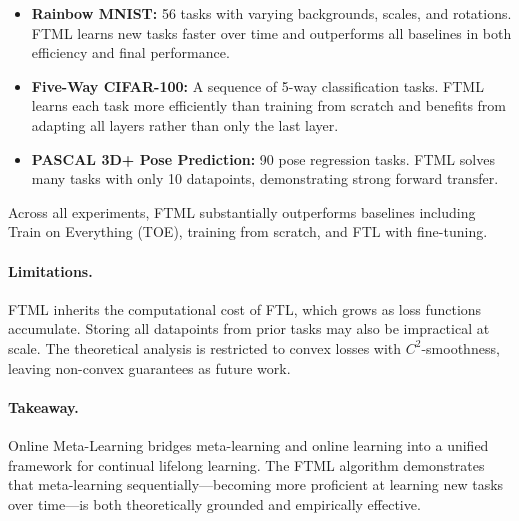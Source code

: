 \documentclass[12pt]{article}
\begin{document}
\begin{itemize}
		\item \textbf{Rainbow MNIST:} 56 tasks with varying backgrounds, scales,
				and rotations. FTML learns new tasks faster over time and outperforms
				all baselines in both efficiency and final performance.
		\item \textbf{Five-Way CIFAR-100:} A sequence of 5-way classification tasks.
				FTML learns each task more efficiently than training from scratch and
				benefits from adapting all layers rather than only the last layer.
		\item \textbf{PASCAL 3D+ Pose Prediction:} 90 pose regression tasks. FTML
				solves many tasks with only 10 datapoints, demonstrating strong
				forward transfer.
\end{itemize}

Across all experiments, FTML substantially outperforms baselines including
Train on Everything (TOE), training from scratch, and FTL with fine-tuning.

\paragraph{Limitations.}
FTML inherits the computational cost of FTL, which grows as loss functions
accumulate. Storing all datapoints from prior tasks may also be impractical
at scale. The theoretical analysis is restricted to convex losses with
$C^2$-smoothness, leaving non-convex guarantees as future work.

\paragraph{Takeaway.}
Online Meta-Learning bridges meta-learning and online learning into a unified
framework for continual lifelong learning. The FTML algorithm demonstrates that
meta-learning sequentially---becoming more proficient at learning new tasks over
time---is both theoretically grounded and empirically effective.
\end{document}

